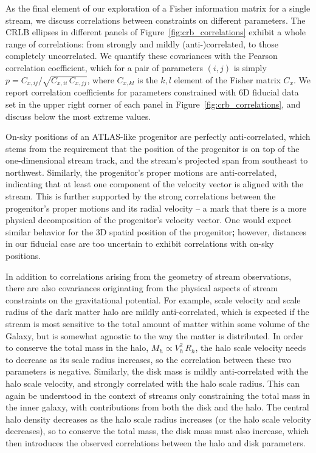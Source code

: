 \documentclass[modern]{aastex62}
\begin{document}
As the final element of our exploration of a Fisher information matrix for a single stream, we discuss correlations between constraints on different parameters.
The CRLB ellipses in different panels of Figure~\ref{fig:crb_correlations} exhibit a whole range of correlations: from strongly and mildly (anti-)correlated, to those completely uncorrelated.
We quantify these covariances with the Pearson correlation coefficient, which for a pair of parameters $(i,j)$ is simply $p = C_{x,ij} / \sqrt{C_{x,ii}\,C_{x,jj}}$, where $C_{x,kl}$ is the $k,l$ element of the Fisher matrix $C_x$.
We report correlation coefficients for parameters constrained with 6D fiducial data set in the upper right corner of each panel in Figure~\ref{fig:crb_correlations}, and discuss below the most extreme values.

On-sky positions of an ATLAS-like progenitor are perfectly anti-correlated, which stems from the requirement that the position of the progenitor is on top of the one-dimensional stream track, and the stream's projected span from southeast to northwest.
Similarly, the progenitor's proper motions are anti-correlated, indicating that at least one component of the velocity vector is aligned with the stream.
This is further supported by the strong correlations between the progenitor's proper motions and its radial velocity -- a mark that there is a more physical decomposition of the progenitor's velocity vector.
One would expect similar behavior for the 3D spatial position of the progenitor{\bf;} however, distances in our fiducial case are too uncertain to exhibit correlations with on-sky positions.

In addition to correlations arising from the geometry of stream observations, there are also covariances originating from the physical aspects of stream constraints on the gravitational potential.
For example, scale velocity and scale radius of the dark matter halo are mildly anti-correlated, which is expected if the stream is most sensitive to the total amount of matter within some volume of the Galaxy, but is somewhat agnostic to the way the matter is distributed.
In order to conserve the total mass in the halo, $M_h \propto V_h^2\,R_h$, the halo scale velocity needs to decrease as its scale radius increases, so the correlation between these two parameters is negative.
Similarly, the disk mass is mildly anti-correlated with the halo scale velocity, and strongly correlated with the halo scale radius.
This can again be understood in the context of streams only constraining the total mass in the inner galaxy, with contributions from both the disk and the halo.
The central halo density decreases as the halo scale radius increases (or the halo scale velocity decreases), so to conserve the total mass, the disk mass must also increase, which then introduces the observed correlations between the halo and disk parameters. 
\end{document}
